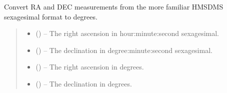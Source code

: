 \documentclass[letterpaper,11pt,english]{sphinxmanual}
\begin{document}

\begin{savenotes}\begin{fulllineitems}
\label{\detokenize{code/opihiexarata.library.conversion:opihiexarata.library.conversion.sexagesimal_ra_dec_to_degrees}}
\pysigstartsignatures
{}
\pysigstopsignatures
\sphinxAtStartPar
Convert RA and DEC measurements from the more familiar HMSDMS
sexagesimal format to degrees.
\begin{quote}\begin{description}
\begin{itemize}
\item {} 
\sphinxAtStartPar
{} () – The right ascension in hour:minute:second sexagesimal.

\item {} 
\sphinxAtStartPar
{} () – The declination in degree:minute:second sexagesimal.

\end{itemize}

\sphinxAtStartPar
\begin{itemize}
\item {} 
\sphinxAtStartPar
{} () – The right ascension in degrees.

\item {} 
\sphinxAtStartPar
{} () – The declination in degrees.

\end{itemize}


\end{description}\end{quote}

\end{fulllineitems}\end{savenotes}
\end{document}
